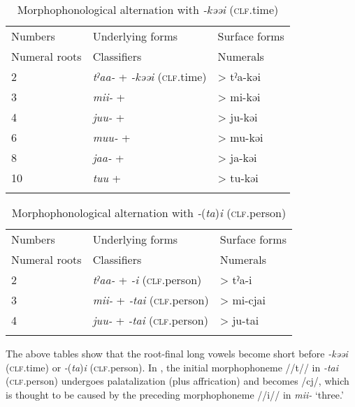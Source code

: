 \begin{table}
\caption{\label{tab:key:52} Morphophonological alternation with \textit{{}-kəəi} (\textsc{clf}.time)}
\begin{tabular}{lll}
\lsptoprule
Numbers & Underlying forms    & Surface forms\\
Numeral  roots  &  Classifiers    & Numerals\\
\midrule
2 & \textit{tˀaa-} +  \textit{{}-kəəi} (\textsc{clf}.time) & >  tˀa-kəi\\
3 & \textit{mii-}  +                                       & >  mi-kəi \\
4 & \textit{juu-}  +                                       & >  ju-kəi \\
6 & \textit{muu-}  +                                       & >  mu-kəi \\
8 & \textit{jaa-}  +                                       & >  ja-kəi \\
10&  \textit{tuu}  +                                       & >  tu-kəi \\
\lspbottomrule
\end{tabular}

\end{table}

\begin{table}
\caption{\label{tab:key:53} Morphophonological alternation with \textit{{}-}(\textit{ta})\textit{i} (\textsc{clf}.person)}
\begin{tabular}{lll}
\lsptoprule
Numbers  & Underlying forms    & Surface forms\\
  Numeral roots    & Classifiers    & Numerals\\
\midrule
2  & \textit{tˀaa-}  +  \textit{{}-i} (\textsc{clf}.person)  &>  tˀa-i    \\
3  & \textit{mii-}  +  \textit{{}-tai} (\textsc{clf}.person) & >  mi-cjai \\
4  & \textit{juu-}  +  \textit{{}-tai} (\textsc{clf}.person) & >  ju-tai  \\
\lspbottomrule
\end{tabular}
\end{table}

The above tables show that the root-final long vowels become short before \textit{{}-kəəi} (\textsc{clf}.time) or \textit{{}-}(\textit{ta})\textit{i} (\textsc{clf}.person). In , the initial morphophoneme //t// in \textit{{}-tai} (\textsc{clf}.person) undergoes palatalization (plus affrication) and becomes /cj/, which is thought to be caused by the preceding morphophoneme //i// in \textit{mii-} ‘three.’

